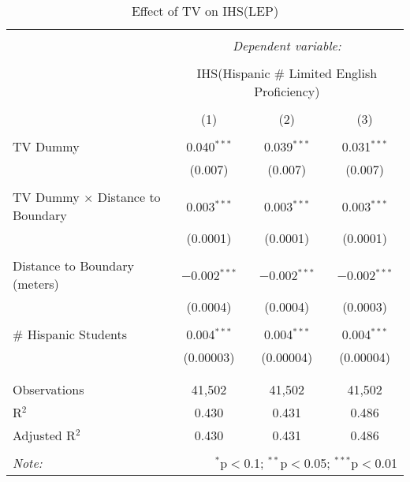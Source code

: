 
\begin{table}[!htbp] \centering 
  \caption{Effect of TV on IHS(LEP)} 
  \label{} 
\begin{tabular}{@{\extracolsep{-2pt}}lccc} 
\\[-1.8ex]\hline 
\hline \\[-1.8ex] 
 & \multicolumn{3}{c}{\textit{Dependent variable:}} \\ 
\cline{2-4} 
\\[-1.8ex] & \multicolumn{3}{c}{IHS(Hispanic \# Limited English Proficiency)} \\ 
\\[-1.8ex] & (1) & (2) & (3)\\ 
\hline \\[-1.8ex] 
 TV Dummy & 0.040$^{***}$ & 0.039$^{***}$ & 0.031$^{***}$ \\ 
  & (0.007) & (0.007) & (0.007) \\ 
  & & & \\ 
 TV Dummy $\times$ Distance to Boundary & 0.003$^{***}$ & 0.003$^{***}$ & 0.003$^{***}$ \\ 
  & (0.0001) & (0.0001) & (0.0001) \\ 
  & & & \\ 
 Distance to Boundary (meters) & $-$0.002$^{***}$ & $-$0.002$^{***}$ & $-$0.002$^{***}$ \\ 
  & (0.0004) & (0.0004) & (0.0003) \\ 
  & & & \\ 
 \# Hispanic Students & 0.004$^{***}$ & 0.004$^{***}$ & 0.004$^{***}$ \\ 
  & (0.00003) & (0.00004) & (0.00004) \\ 
  & & & \\ 
\hline \\[-1.8ex] 
Observations & 41,502 & 41,502 & 41,502 \\ 
R$^{2}$ & 0.430 & 0.431 & 0.486 \\ 
Adjusted R$^{2}$ & 0.430 & 0.431 & 0.486 \\ 
\hline 
\hline \\[-1.8ex] 
\textit{Note:}  & \multicolumn{3}{r}{$^{*}$p$<$0.1; $^{**}$p$<$0.05; $^{***}$p$<$0.01} \\ 
\end{tabular} 
\end{table} 
